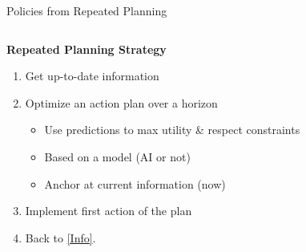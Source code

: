 \documentclass[lecture]{beamer}
\begin{document}
\begin{frame}{\normalsize Policies from Repeated Planning}
\begin{columns}
\begin{block}{}
\textbf{Repeated Planning Strategy}
\vspace{-.1cm}
\begin{enumerate}
\scriptsize
\item\label{Info} Get up-to-date information
\item Optimize an \textcolor{myRed}{action plan} over a horizon
\begin{itemize}
\scriptsize
\item Use \textcolor{myBlue2}{predictions} to max utility \& respect constraints
\item Based on a model (AI or not)
\item Anchor at \textcolor{myGreen2}{current information (now)}
\end{itemize}
\item Implement first action of the plan
\item Back to \ref{Info}.%
\end{enumerate}
\end{block}
\end{columns}

\end{frame}
\end{document}
